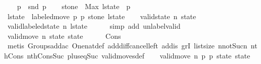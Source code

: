 \begin{isabellebody}
\ \ \isamarkupfalse%
\ {\isacharquery}p{}\ {\isacharequal}\ {\isachardoublequoteopen}snd\ {\isacharquery}p{\isachardoublequoteclose}\isanewline
\ \ \isamarkupfalse%
\ {\isacharquery}stone\ {\isacharequal}\ {\isachardoublequoteopen}Max\ {\isacharparenleft}l{\isacharunderscore}state\ {\isacharbang}\ {\isacharquery}p{}{\isacharparenright}{\isachardoublequoteclose}\isanewline
\ \ \isamarkupfalse%
\ {\isacharquery}l{\isacharunderscore}state{\isacharprime}\ {\isacharequal}\ {\isachardoublequoteopen}labeled{\isacharunderscore}move\ {\isacharquery}p{}\ {\isacharquery}p{}\ {\isacharquery}stone\ l{\isacharunderscore}state{\isachardoublequoteclose}\isanewline
\isanewline
\ \ \isamarkupfalse%
\ {\isachardoublequoteopen}valid{\isacharunderscore}state\ n\ {\isacharquery}state{\isachardoublequoteclose}\isanewline
\ \ \ \ \isamarkupfalse%
\ {\isacharbackquoteopen}valid{\isacharunderscore}labeled{\isacharunderscore}state\ n\ l{\isacharunderscore}state{\isacharbackquoteclose}\isanewline
\ \ \ \ \isamarkupfalse%
\ {\isacharparenleft}simp\ add{\isacharcolon}\ unlabel{\isacharunderscore}valid{\isacharparenright}\isanewline
\isanewline
\ \ \isamarkupfalse%
\ {\isachardoublequoteopen}valid{\isacharunderscore}move\ n\ {\isacharquery}state\ state{\isacharprime}{\isachardoublequoteclose}\isanewline
\ \ \ \ \isamarkupfalse%
\ Cons{\isacharparenleft}{}{\isacharparenright}\isanewline
\ \ \ \ \isamarkupfalse%
\ {\isacharparenleft}metis\ Groups{\isachardot}add{\isacharunderscore}ac{\isacharparenleft}{}{\isacharparenright}\ One{\isacharunderscore}nat{\isacharunderscore}def\ add{\isacharunderscore}diff{\isacharunderscore}cancel{\isacharunderscore}left{\isacharprime}\ add{\isacharunderscore}is{\isacharunderscore}{}\ gr{}I\ list{\isachardot}size{\isacharparenleft}{}{\isacharparenright}\ n{\isacharunderscore}not{\isacharunderscore}Suc{\isacharunderscore}n\ nth{\isacharunderscore}Cons{\isacharunderscore}{}\ nth{\isacharunderscore}Cons{\isacharunderscore}Suc\ plus{\isacharunderscore}{}{\isacharunderscore}eq{\isacharunderscore}Suc\ valid{\isacharunderscore}moves{\isacharunderscore}def{\isacharparenright}\isanewline
\isanewline
\ \ \isamarkupfalse%
\ {\isachardoublequoteopen}valid{\isacharunderscore}move{\isacharprime}\ n\ {\isacharquery}p{}\ {\isacharquery}p{}\ {\isacharquery}state\ state{\isacharprime}{\isachardoublequoteclose}\isanewline

\end{isabellebody}

